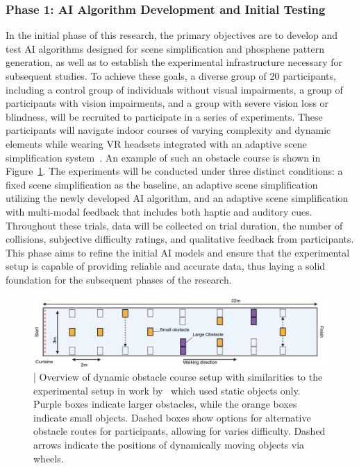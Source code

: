 \documentclass[10pt]{article}
\begin{document}
\subsubsection*{Phase 1: AI Algorithm Development and Initial Testing}
In the initial phase of this research, the primary objectives are to develop and
test AI algorithms designed for scene simplification and phosphene pattern
generation, as well as to establish the experimental infrastructure necessary
for subsequent studies. To achieve these goals, a diverse group of 20
participants, including a control group of individuals without visual
impairments, a group of participants with vision impairments, and a group with
severe vision loss or blindness, will be recruited to participate in a series of
experiments. These participants will navigate indoor courses of varying
complexity and dynamic elements while wearing VR headsets integrated with an
adaptive scene simplification
system~\parencite{deruytervansteveninckRealworldIndoorMobility2022}. An example
of such an obstacle course is shown in Figure~\ref{fig:obstacle_course}. The
experiments will be conducted under three distinct conditions: a fixed scene
simplification as the baseline, an adaptive scene simplification utilizing the
newly developed AI algorithm, and an adaptive scene simplification with
multi-modal feedback that includes both haptic and auditory cues. Throughout
these trials, data will be collected on trial duration, the number of
collisions, subjective difficulty ratings, and qualitative feedback from
participants. This phase aims to refine the initial AI models and ensure that
the experimental setup is capable of providing reliable and accurate data, thus
laying a solid foundation for the subsequent phases of the research.

\begin{figure}[ht!]
  \centering
  \includegraphics[width=1.0\textwidth]{imgs/Obstacle_course.png}
  \caption{| Overview of dynamic obstacle course setup with similarities to the experimental
    setup in work by~\textcite{deruytervansteveninckRealworldIndoorMobility2022}
    which used static objects only.
    Purple boxes indicate larger obstacles, while the orange boxes indicate small
    objects. Dashed boxes show options for alternative obstacle routes for
    participants, allowing for varies difficulty. Dashed arrows indicate the
    positions of dynamically moving objects via wheels.}\label{fig:obstacle_course}
\end{figure}
\end{document}
